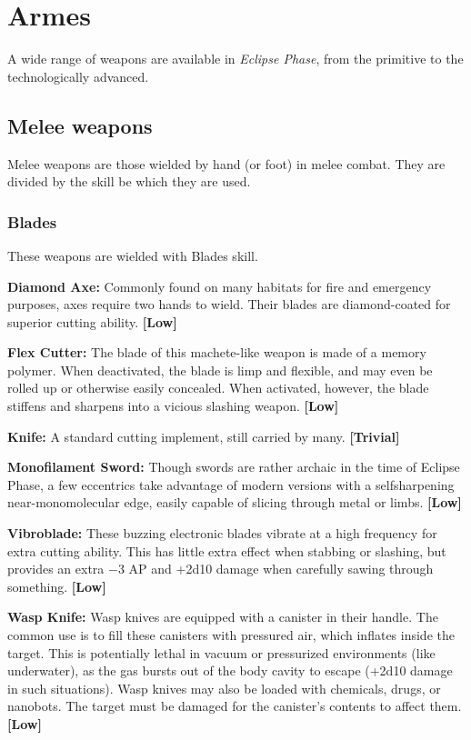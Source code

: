 \section{Armes} \label{sec:weapons} 

A wide range of weapons are available in \emph{Eclipse Phase}, from the primitive to the technologically advanced. 



\subsection{Melee weapons} \label{sec:melee-weapons} 

Melee weapons are those wielded by hand (or foot) in melee combat. They are divided by the skill be which they are used. 

\subsubsection{Blades} 

These weapons are wielded with Blades skill. 

\textbf{Diamond Axe:} Commonly found on many habitats for fire and emergency purposes, axes require two hands to wield. Their blades are diamond-coated for superior cutting ability. \textbf{[Low]} 

\textbf{Flex Cutter:} The blade of this machete-like weapon is made of a memory polymer. When deactivated, the blade is limp and flexible, and may even be rolled up or otherwise easily concealed. When activated, however, the blade stiffens and sharpens into a vicious slashing weapon. \textbf{[Low]} 

\textbf{Knife:} A standard cutting implement, still carried by many. \textbf{[Trivial]} 

\textbf{Monofilament Sword:} Though swords are rather archaic in the time of Eclipse Phase, a few eccentrics take advantage of modern versions with a selfsharpening near-monomolecular edge, easily capable of slicing through metal or limbs. \textbf{[Low]} 

\textbf{Vibroblade:} These buzzing electronic blades vibrate at a high frequency for extra cutting ability. This has little extra effect when stabbing or slashing, but provides an extra $-$3 AP and +2d10 damage when carefully sawing through something. \textbf{[Low]} 

\textbf{Wasp Knife:} Wasp knives are equipped with a canister in their handle. The common use is to fill these canisters with pressured air, which inflates inside the target. This is potentially lethal in vacuum or pressurized environments (like underwater), as the gas bursts out of the body cavity to escape (+2d10 damage in such situations). Wasp knives may also be loaded with chemicals, drugs, or nanobots. The target must be damaged for the canister’s contents to affect them. \textbf{[Low]} 

